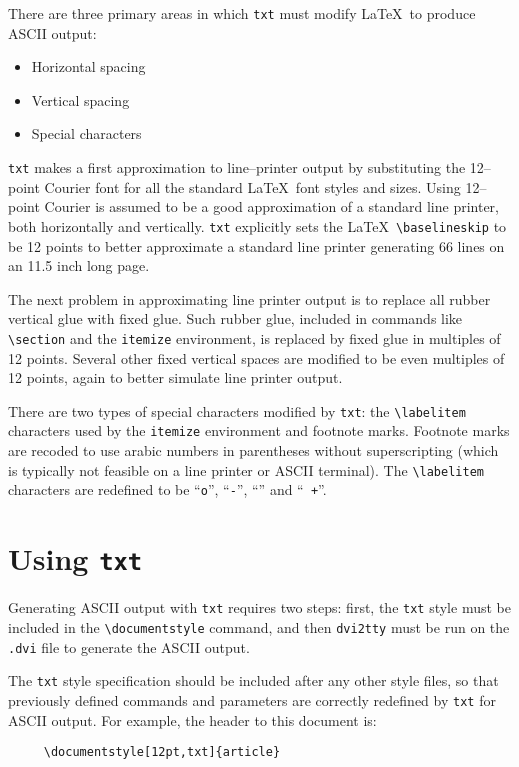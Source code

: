 There are three primary areas in which {\tt txt} must modify \LaTeX\
to produce ASCII output:

\begin{itemize}
\item Horizontal spacing
\item Vertical spacing
\item Special characters
\end{itemize}

{\tt txt} makes a first approximation to line--printer output by
substituting the 12--point Courier font for all the standard \LaTeX\
font styles and sizes. Using 12--point Courier is assumed to be a good
approximation of a standard line printer, both horizontally and
vertically.  {\tt txt} explicitly sets the \LaTeX\
\verb+\baselineskip+ to be 12 points to better approximate a standard
line printer generating 66 lines on an 11.5 inch long page.

The next problem in approximating line printer output is to replace
all rubber vertical glue with fixed glue. Such rubber glue, included
in commands like \verb+\section+ and the {\tt itemize} environment, is
replaced by fixed glue in multiples of 12 points. Several other fixed
vertical spaces are modified to be even multiples of 12 points, again
to better simulate line printer output.

There are two types of special characters modified by {\tt txt}: the
\verb+\labelitem+ characters used by the {\tt itemize} environment and
footnote marks. Footnote marks are recoded to use arabic numbers in
parentheses without superscripting (which is typically not feasible on
a line printer or ASCII terminal). The \verb+\labelitem+ characters
are redefined to be ``{\tt o}'', ``{\tt -}'', ``{\tt *}'' and ``{\tt
+}''.

\section{Using {\tt txt}}

Generating ASCII output with {\tt txt} requires two steps: first, the
{\tt txt} style must be included in the \verb+\documentstyle+ command,
and then {\tt dvi2tty} must be run on the {\tt .dvi} file to generate
the ASCII output.

The {\tt txt} style specification should be included after any other
style files, so that previously defined commands and parameters are
correctly redefined by {\tt txt} for ASCII output. For example, the
header to this document is:
\begin{verbatim}
     \documentstyle[12pt,txt]{article}
\end{verbatim}


